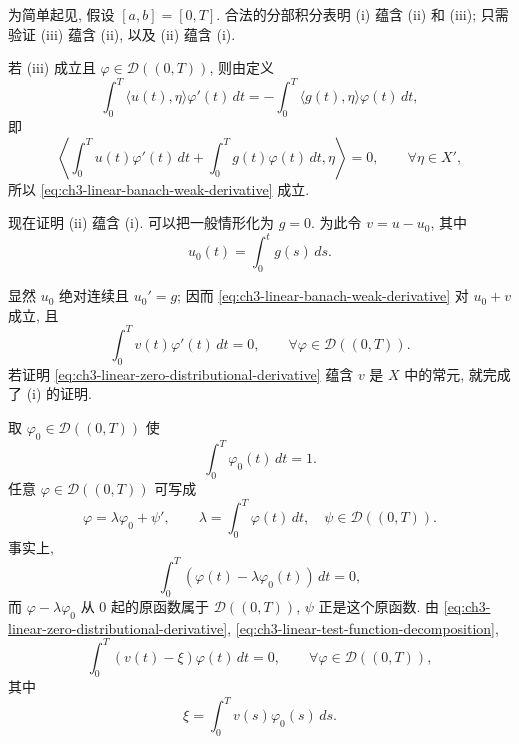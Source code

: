 \begin{Proof}
为简单起见, 假设 $[a,b]=[0,T]$. 合法的分部积分表明 (i) 蕴含 (ii) 和 (iii); 只需验证 (iii) 蕴含 (ii), 以及 (ii) 蕴含 (i).

若 (iii) 成立且 $\varphi\in\mathcal D((0,T))$, 则由定义
\begin{equation}
\int_0^T\langle u(t),\eta\rangle\varphi'(t)\,dt
=-\int_0^T\langle g(t),\eta\rangle\varphi(t)\,dt,
\label{eq:ch3-linear-scalar-integration-by-parts}
\end{equation}
即
\[
\left\langle
\int_0^T u(t)\varphi'(t)\,dt
+\int_0^T g(t)\varphi(t)\,dt,\eta
\right\rangle=0,
\qquad\forall\eta\in X',
\]
所以 \eqref{eq:ch3-linear-banach-weak-derivative} 成立.

现在证明 (ii) 蕴含 (i). 可以把一般情形化为 $g=0$. 为此令 $v=u-u_0$, 其中
\begin{equation}
u_0(t)=\int_0^t g(s)\,ds.
\label{eq:ch3-linear-primitive-u-zero}
\end{equation}

\hypertarget{chapter-03-page-185}{}
显然 $u_0$ 绝对连续且 $u_0'=g$; 因而 \eqref{eq:ch3-linear-banach-weak-derivative} 对 $u_0+v$ 成立, 且
\begin{equation}
\int_0^T v(t)\varphi'(t)\,dt=0,
\qquad\forall\varphi\in\mathcal D((0,T)).
\label{eq:ch3-linear-zero-distributional-derivative}
\end{equation}
若证明 \eqref{eq:ch3-linear-zero-distributional-derivative} 蕴含 $v$ 是 $X$ 中的常元, 就完成了 (i) 的证明.

取 $\varphi_0\in\mathcal D((0,T))$ 使
\[
\int_0^T\varphi_0(t)\,dt=1.
\]
任意 $\varphi\in\mathcal D((0,T))$ 可写成
\begin{equation}
\varphi=\lambda\varphi_0+\psi',
\qquad
\lambda=\int_0^T\varphi(t)\,dt,
\quad \psi\in\mathcal D((0,T)).
\label{eq:ch3-linear-test-function-decomposition}
\end{equation}
事实上,
\[
\int_0^T(\varphi(t)-\lambda\varphi_0(t))\,dt=0,
\]
而 $\varphi-\lambda\varphi_0$ 从 $0$ 起的原函数属于 $\mathcal D((0,T))$, $\psi$ 正是这个原函数. 由 \eqref{eq:ch3-linear-zero-distributional-derivative}, \eqref{eq:ch3-linear-test-function-decomposition},
\begin{equation}
\int_0^T(v(t)-\xi)\varphi(t)\,dt=0,
\qquad\forall\varphi\in\mathcal D((0,T)),
\label{eq:ch3-linear-vector-distribution-constant}
\end{equation}
其中
\[
\xi=\int_0^T v(s)\varphi_0(s)\,ds.
\]


\end{Proof}
